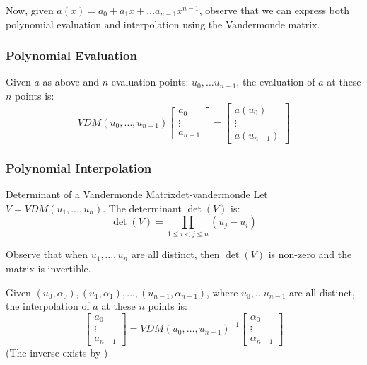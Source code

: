 Now, given $a(x) = a_0 + a_1x + \ldots a_{n-1}x^{n-1}$, observe that we can express both polynomial evaluation and interpolation using the Vandermonde matrix.

\subsubsection{Polynomial Evaluation}
Given $a$ as above and $n$ evaluation points: $u_0, \ldots u_{n - 1}$, the evaluation of $a$ at these $n$ points is:
\begin{equation}\label{eq:vandermonde-poly-eval}
    VDM(u_0, \ldots, u_{n-1})
    \begin{bmatrix}
        a_0 \\ \vdots \\ a_{n-1}
    \end{bmatrix}
    =
    \begin{bmatrix}
        a(u_0) \\ \vdots \\ a(u_{n-1})
    \end{bmatrix}
\end{equation}

\subsubsection{Polynomial Interpolation}
\begin{proposition}{Determinant of a Vandermonde Matrix}{det-vandermonde}
    Let $V = VDM(u_1, \ldots, u_n)$. The determinant $\det(V)$ is:
    \begin{equation}\label{eq:vandermonde-poly-interp}
        \det(V) = \prod_{1 \leq i < j \leq n} (u_j - u_i)
    \end{equation}
\end{proposition}
\begin{remark}
    Observe that when $u_1, \ldots, u_n$ are all distinct, then $\det(V)$ is non-zero and the matrix is invertible.
\end{remark}
Given $(u_0, \alpha_0), (u_1, \alpha_1), \ldots, (u_{n-1}, \alpha_{n-1})$, where $u_0, \ldots u_{n-1}$ are all distinct, the interpolation of $a$ at these $n$ points is:
\begin{equation}
    \begin{bmatrix}
        a_0 \\ \vdots \\ a_{n-1}
    \end{bmatrix}
    =
    VDM(u_0, \ldots, u_{n-1})^{-1}
    \begin{bmatrix}
        \alpha_0 \\ \vdots \\ \alpha_{n-1}
    \end{bmatrix}
\end{equation}
(The inverse exists by )

